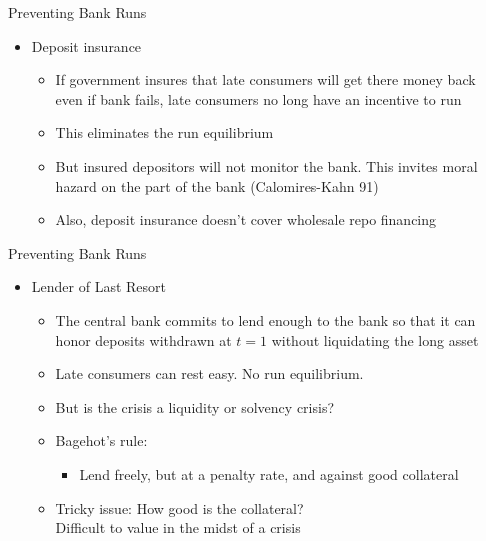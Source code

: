 \documentclass[11pt,aspectratio=169,xcolor={dvipsnames},hyperref={pdftex,pdfpagemode=UseNone,hidelinks,pdfdisplaydoctitle=true},usepdftitle=false]{beamer}
\begin{document}
\begin{frame}{Preventing Bank Runs}
\begin{itemize}
	\addtocounter{enumi}{1}
	\item Deposit insurance
	\begin{itemize}
		\item If government insures that late consumers will get there money back \\ even if bank fails, late consumers no long have an incentive to run
		\item This eliminates the run equilibrium
		\item But insured depositors will not monitor the bank. This invites moral hazard on the part of the bank {\small (Calomires-Kahn 91)}
		\item Also, deposit insurance doesn't cover wholesale repo financing  
	\end{itemize}
\end{itemize}
\end{frame}



\begin{frame}{Preventing Bank Runs}
\begin{itemize}
	\addtocounter{enumi}{2}
	\item Lender of Last Resort
	\begin{itemize}
		\item The central bank commits to lend enough to the bank so that it can honor deposits withdrawn at $t=1$ without liquidating the long asset
		\item Late consumers can rest easy. No run equilibrium.
		\item But is the crisis a liquidity or solvency crisis?
		\item Bagehot's rule:
		\begin{itemize}
			\item Lend freely, but at a penalty rate, and against good collateral
		\end{itemize}
		\item Tricky issue: How good is the collateral? \\ Difficult to value in the midst of a crisis
	\end{itemize}
\end{itemize}
\end{frame}
\end{document}
